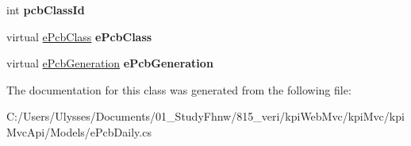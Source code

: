 \begin{DoxyCompactItemize}
int {\bfseries pcb\+Class\+Id}
\item 
\mbox{\label{classkpi_mvc_api_1_1_models_1_1e_pcb_daily_a2303b9e2a5e070fc2a1152ab62f25a04}} 
virtual \hyperlink{classkpi_mvc_api_1_1_models_1_1e_pcb_class}{e\+Pcb\+Class} {\bfseries e\+Pcb\+Class}
\item 
\mbox{\label{classkpi_mvc_api_1_1_models_1_1e_pcb_daily_aa2ea9753f4bb18a5ec49b332fb6cb120}} 
virtual \hyperlink{classkpi_mvc_api_1_1_models_1_1e_pcb_generation}{e\+Pcb\+Generation} {\bfseries e\+Pcb\+Generation}
\end{DoxyCompactItemize}


The documentation for this class was generated from the following file\+:\begin{DoxyCompactItemize}
\item 
C\+:/\+Users/\+Ulysses/\+Documents/01\+\_\+\+Study\+Fhnw/815\+\_\+veri/kpi\+Web\+Mvc/kpi\+Mvc/kpi\+Mvc\+Api/\+Models/e\+Pcb\+Daily.\+cs\end{DoxyCompactItemize}
